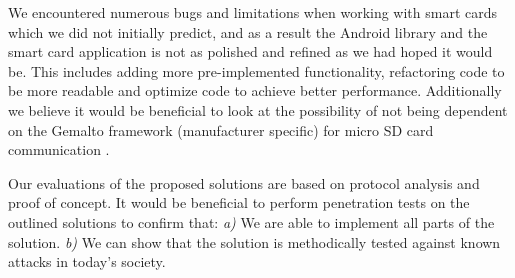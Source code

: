 We encountered numerous bugs and limitations when working with smart cards which we did not initially predict, and as a result the Android library and the smart card application is not as polished and refined as we had hoped it would be. This includes adding more pre-implemented functionality, refactoring code to be more readable and optimize code to achieve better performance. Additionally we believe it would be beneficial to look at the possibility of not being dependent on the Gemalto framework (manufacturer specific) for micro SD card communication \cite[\textit{SEEK for Android}]{SEEK}.

Our evaluations of the proposed solutions are based on protocol analysis and proof of concept. It would be beneficial to perform penetration tests on the outlined solutions to confirm that: \textit{a)} We are able to implement all parts of the solution. \textit{b)} We can show that the solution is methodically tested against known attacks in today's society.
